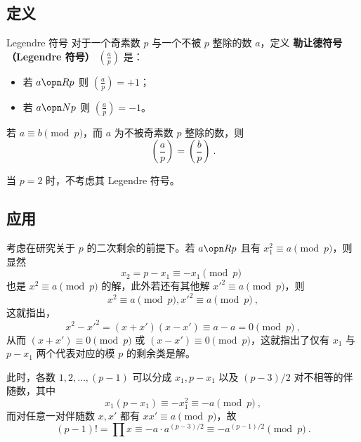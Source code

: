 
\subsection{定义}
\begin{definition}{Legendre 符号}
对于一个奇素数 $p$ 与一个不被 $p$ 整除的数 $a$，定义 \textbf{勒让德符号（Legendre 符号）} $\left( \frac{a}{p} \right)$ 是：
\begin{itemize}
\item 若 $a \opn R p$ 则 $\left( \frac{a}{p} \right) = +1$；
\item 若 $a \opn N p$ 则 $\left( \frac{a}{p} \right) = -1$。
\end{itemize}
\end{definition}

\begin{corollary}{}
若 $a \equiv b \pmod p$，而 $a$ 为不被奇素数 $p$ 整除的数，则
\begin{equation}
\left(\frac ap \right) = \left(\frac bp \right) ~.
\end{equation}

\end{corollary}

当 $p=2$ 时，不考虑其 Legendre 符号。

\subsection{应用}
考虑在研究关于 $p$ 的二次剩余的前提下。若 $a \opn R p$ 且有 $x_1^2 \equiv a \pmod p$，则显然
\begin{equation}
x_2 = p-x_1 \equiv -x_1 \pmod p ~~
\end{equation}
也是 $x^2 \equiv a \pmod p$ 的解，此外若还有其他解 $x'^2 \equiv a \pmod p$，则
\begin{equation}
x^2 \equiv a \pmod p, x'^2 \equiv a \pmod p ~,
\end{equation}
这就指出，
\begin{equation}
x^2 - x'^2 = (x+x')(x-x') \equiv a - a = 0 \pmod p ~,
\end{equation}
从而 $(x+x') \equiv 0 \pmod p$ 或 $(x-x') \equiv 0 \pmod p$，这就指出了仅有 $x_1$ 与 $p-x_1$ 两个代表对应的模 $p$ 的剩余类是解。

此时，各数 $1, 2, \dots, (p-1)$ 可以分成 $x_1, p-x_1$ 以及 $(p-3)/2$ 对不相等的伴随数，其中
\begin{equation}
x_1(p-x_1) \equiv -x_1^2 \equiv -a \pmod p ~,
\end{equation}
而对任意一对伴随数 $x, x'$ 都有 $xx' \equiv a \pmod p$，故
\begin{equation}
(p-1)! = \prod x \equiv -a \cdot a^{(p-3)/2} \equiv -a ^{(p-1)/2} \pmod p ~.
\end{equation}


